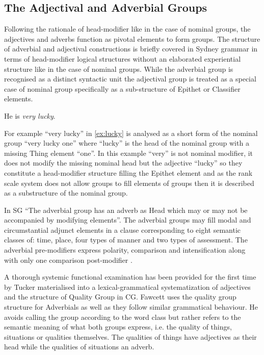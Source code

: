 	\subsection{The Adjectival and Adverbial Groups}
	\label{sec:advectival-adverbial-groups}
	Following the rationale of head-modifier like in the case of nominal groups, the adjectives and adverbs function as pivotal elements to form groups. The structure of adverbial and adjectival constructions is briefly covered in Sydney grammar in terms of head-modifier logical structures without an elaborated experiential structure like in the case of nominal groups. While the adverbial group is recognised as a distinct syntactic unit the adjectival group is treated as a special case of nominal group specifically as a sub-structure of Epithet or Classifier elements.
	
	\begin{exe}
		\ex\label{ex:lucky} He is \textit{very lucky}.
	\end{exe}
	
	For example ``very lucky'' in \ref{ex:lucky} is analysed as a short form of the nominal group ``very lucky one'' where ``lucky'' is the head of the nominal group with a missing Thing element ``one''. In this example ``very'' is not nominal modifier, it does not modify the missing nominal head but the adjective ``lucky'' so they constitute a head-modifier structure filling the Epithet element and as the rank scale system does not allow groups to fill elements of groups then it is described as a substructure of the nominal group.
	
	In SG ``The adverbial group has an adverb as Head which may or may not be accompanied by modifying elements''\citep[p.~419]{Halliday2013}. The adverbial groups may fill modal and circumstantial adjunct elements in a clause corresponding to eight semantic classes of: time, place, four types of manner and two types of assessment. The adverbial pre-modifiers express polarity, comparison and intensification along with only one comparison post-modifier \citep[p.420-421]{Halliday2013}. 
	
	
	A thorough systemic functional examination has been provided for the first time by Tucker \citet{Tucker1997,Tucker1998} materialised into a lexical-grammatical systematization of adjectives and the structure of Quality Group in CG. Fawcett uses the quality group structure for Adverbials as well as they follow similar grammatical behaviour. He avoids calling the group according to the word class but rather refers to the semantic meaning of what both groups express, i.e. the quality of things, situations or qualities themselves. The qualities of things have adjectives as their head while the qualities of situations an adverb. 
	
